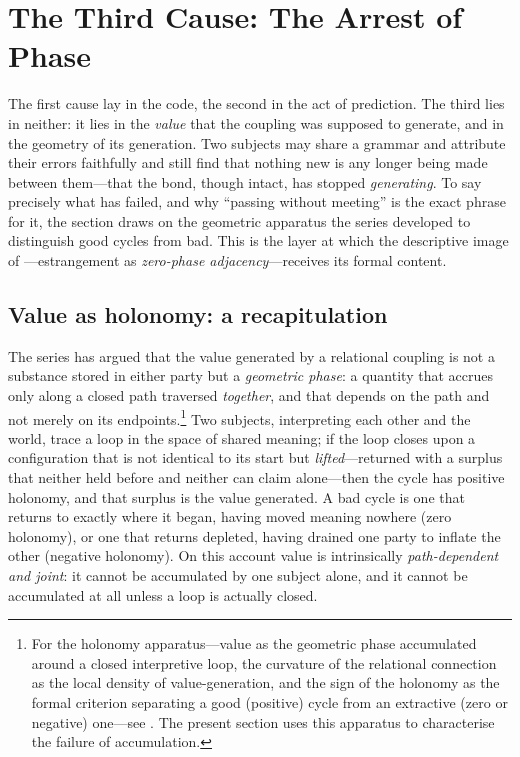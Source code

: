 \section{The Third Cause: The Arrest of Phase}
\label{p17:sec:phase}

\noindent
The first cause lay in the code, the second in the act of prediction. The third lies in neither: it lies in the \emph{value} that the coupling was supposed to generate, and in the geometry of its generation. Two subjects may share a grammar and attribute their errors faithfully and still find that nothing new is any longer being made between them---that the bond, though intact, has stopped \emph{generating}. To say precisely what has failed, and why ``passing without meeting'' is the exact phrase for it, the section draws on the geometric apparatus the series developed to distinguish good cycles from bad. This is the layer at which the descriptive image of ---estrangement as \emph{zero-phase adjacency}---receives its formal content.

\subsection{Value as holonomy: a recapitulation}
\label{p17:sub:phase-recap}

The series has argued that the value generated by a relational coupling is not a substance stored in either party but a \emph{geometric phase}: a quantity that accrues only along a closed path traversed \emph{together}, and that depends on the path and not merely on its endpoints.\footnote{For the holonomy apparatus---value as the geometric phase accumulated around a closed interpretive loop, the curvature of the relational connection as the local density of value-generation, and the sign of the holonomy as the formal criterion separating a good (positive) cycle from an extractive (zero or negative) one---see \textcite{paperix}. The present section uses this apparatus to characterise the failure of accumulation.} Two subjects, interpreting each other and the world, trace a loop in the space of shared meaning; if the loop closes upon a configuration that is not identical to its start but \emph{lifted}---returned with a surplus that neither held before and neither can claim alone---then the cycle has positive holonomy, and that surplus is the value generated. A bad cycle is one that returns to exactly where it began, having moved meaning nowhere (zero holonomy), or one that returns depleted, having drained one party to inflate the other (negative holonomy). On this account value is intrinsically \emph{path-dependent and joint}: it cannot be accumulated by one subject alone, and it cannot be accumulated at all unless a loop is actually closed.

